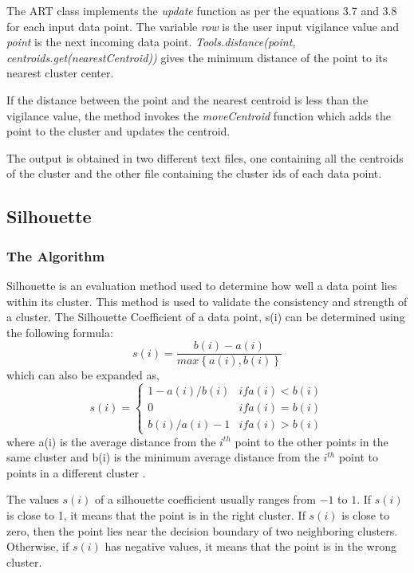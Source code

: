 \documentclass{lmproj}
\begin{document}
The ART class implements the \textit{update} function as per the equations 3.7 and 3.8 for each input data point. The variable \textit{row} is the user input vigilance value and \textit{point} is the next incoming data point. \textit{Tools.distance(point, centroids.get(nearestCentroid))} gives the minimum distance of the point to its nearest cluster center.



If the distance between the point and the nearest centroid is less than the vigilance value, the method invokes the \textit{moveCentroid} function which adds the point to the cluster and updates the centroid.



The output is obtained in two different text files, one containing all the centroids of the cluster and the other file containing the cluster ids of each data point.

\subsection{Silhouette}
\subsubsection{The Algorithm}
Silhouette is an evaluation method used to determine how well a data point lies within its cluster. This method is used to validate the consistency and strength of a cluster. The Silhouette Coefficient of a data point, s(i) can be determined using the following formula:
\begin{equation}
s(i) = \frac{b(i) - a(i)}{max\left\{a(i), b(i)\right\}}
\end{equation}
which can also be expanded as,
\begin{equation}
s(i) = \begin{cases}
1-a(i)/b(i) & if a(i)<b(i)
\\0 & if a(i)=b(i)
\\b(i)/a(i) -1 & if a(i)>b(i)
\end{cases}
\end{equation}
where a(i) is the average distance from the $i^{th}$ point to the other points in the same cluster and b(i) is the minimum average distance from the $i^{th}$ point to points in a different cluster \cite{Rousseeuw}.

The values $s(i)$ of a silhouette coefficient usually ranges from $-1$ to $1$. If $s(i)$ is close to 1, it means that the point is in the right cluster. If $s(i)$ is close to zero, then the point lies near the decision boundary of two neighboring clusters. Otherwise, if $s(i)$ has negative values, it means that the point is in the wrong cluster.
\end{document}
